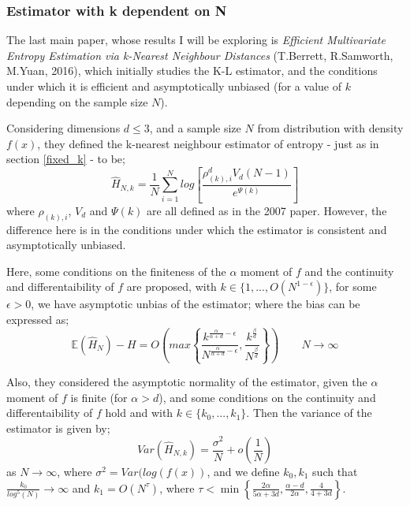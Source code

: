 \documentclass{report}
\begin{document}
\subsubsection{Estimator with k dependent on N} \label{dependent_k}

The last main paper, whose results I will be exploring is \textit{Efficient Multivariate Entropy Estimation via k-Nearest Neighbour Distances} (T.Berrett, R.Samworth, M.Yuan, 2016), which initially studies the K-L estimator, and the conditions under which it is efficient and asymptotically unbiased (for a value of $k$ depending on the sample size $N$). 

Considering dimensions $d \leq 3$, and a sample size $N$ from distribution with density $f(x)$, they defined the k-nearest neighbour estimator of entropy - just as in section \ref{fixed_k} - to be;
\begin{equation}
\hat{H}_{N, k} = \frac{1}{N} \sum_{i=1}^{N} log \left[ \frac{\rho_{(k),i}^{d} V_{d} (N-1)}{e^{\Psi(k)}} \right]
\end{equation}
where $\rho_{(k),i}$, $V_{d}$ and $\Psi(k)$ are all defined as in the 2007 paper. However, the difference here is in the conditions under which the estimator is consistent and asymptotically unbiased.

Here, some conditions on the finiteness of the $\alpha$ moment of $f$ and the continuity and differentaibility of $f$ are proposed, with $k \in \{1, ..., O(N^{1-\epsilon})\}$, for some $\epsilon > 0$, we have asymptotic unbias of the estimator; where the bias can be expressed as;
\begin{equation}
\mathbb{E} ( \hat{H}_{N} ) - H = O \left( max \left\{ \frac{k^{\frac{\alpha}{\alpha + d} - \epsilon}}{N^{\frac{\alpha}{\alpha + d} - \epsilon}}, \frac{k^{\frac{\beta}{d}}}{N^{\frac{\beta}{d}}} \right\} \right) \quad \quad N \to \infty
\end{equation}

Also, they considered the asymptotic normality of the estimator, given the $\alpha$ moment of $f$ is finite (for $\alpha > d$), and some conditions on the continuity and differentaibility of $f$ hold and with $k \in \{k_{0}, ..., k_{1}\}$. Then the variance of the estimator is given by;
\begin{equation}
Var(\hat{H}_{N, k}) = \frac{\sigma^2}{N} + o(\frac{1}{N})
\end{equation}
as $N \to \infty$, where $\sigma^2 = Var(log(f(x))$, and we define $k_{0}, k_{1}$ such that $\frac{k_{0}}{log^5(N)} \to \infty$ and $k_{1} = O(N^{\tau})$, where $\tau < \min \left\{ \frac{2 \alpha}{5 \alpha + 3d} , \frac{\alpha - d}{2 \alpha} , \frac{4}{4 + 3d} \right\}$. 
\end{document}
